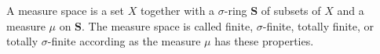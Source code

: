 A measure space is a set $X$ together with a $\sigma$-ring $\mathbf{S}$ of subsets of $X$ and a measure $\mu$ on $\mathbf{S}$. The measure space is called finite, $\sigma$-finite, totally finite, or totally $\sigma$-finite according as the measure $\mu$ has these properties.
